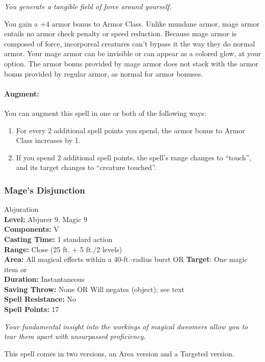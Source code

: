 \emph{You generate a tangible field of force around yourself.}

You gain a +4 armor bonus to Armor Class. 
Unlike mundane armor, mage armor entails no armor check penalty or speed reduction. 
Because mage armor is composed of force, incorporeal creatures can't bypass it the way they do normal armor.
Your mage armor can be invisible or can appear as a colored glow, at your option.
The armor bonus provided by mage armor does not stack with the armor bonus provided by regular armor, as normal for armor bonuses.

\paragraph{Augment:} You can augment this spell in one or both of the following ways:
\begin{enumerate}
 \item For every 2 additional spell points you spend, the armor bonus to Armor Class increases by 1.
 \item If you spend 2 additional spell points, the spell's range changes to ``touch'', and its target changes to ``creature touched''. 
\end{enumerate}
\subsubsection{Mage's Disjunction}
\label{Spell:Disjunction}
Abjuration
\\ \textbf{Level:} Abjurer 9, Magic 9
\\ \textbf{Components:} V
\\ \textbf{Casting Time:} 1 standard action
\\ \textbf{Range:} Close (25 ft. + 5 ft./2 levels)
\\ \textbf{Area:} All magical effects within a 40-ft.-radius burst OR \textbf{Target}: One magic item or 
\\ \textbf{Duration:} Instantaneous
\\ \textbf{Saving Throw:} None OR Will negates (object); see text
\\ \textbf{Spell Resistance:} No
\\ \textbf{Spell Points:} 17

\emph{Your fundamental insight into the workings of magical dweomers allow you to tear them apart with unsurpassed proficiency.}

This spell comes in two versions, an Area version and a Targeted version.

